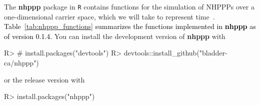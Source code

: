 \documentclass[10pt,letterpaper]{article}
\newcommand{\pkg}[1]{{\bf #1}}
\newcommand{\proglang}[1]{\texttt{#1}}
\newcommand{\red}[1]{\textcolor{black}{#1}}
\begin{document}
The \pkg{nhppp} package in \proglang{R} contains functions for the simulation of NHPPPs over a one-dimensional carrier space, which we will take to represent time~\cite{nhppp-package, trikalinos2024nhppp}. \red{Table~\ref{tab:nhppp_functions} summarizes the functions implemented in \pkg{nhppp} as of version 0.1.4.} You can install the development version of \pkg{nhppp} with
\begin{Schunk}
\begin{Sinput}
R> # install.packages("devtools")
R> devtools::install_github("bladder-ca/nhppp")
\end{Sinput}
\end{Schunk}
or the release version with
\begin{Schunk}
\begin{Sinput}
R> install.packages("nhppp")
\end{Sinput}
\end{Schunk}

\end{document}
